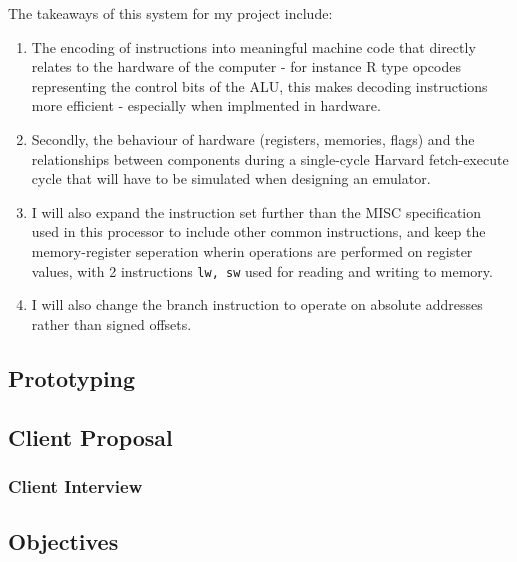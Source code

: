 \bigskip

The takeaways of this system for my project include:
\begin{enumerate}
    \item The encoding of instructions into meaningful machine code that directly relates to the hardware of the computer - for instance R type opcodes representing the control bits of the ALU, this makes decoding instructions more efficient - especially when implmented in hardware.
    \item Secondly, the behaviour of hardware (registers, memories, flags) and the relationships between components during a single-cycle Harvard fetch-execute cycle that will have to be simulated when designing an emulator.
    \item I will also expand the instruction set further than the MISC specification used in this processor to include other common instructions, and keep the memory-register seperation wherin operations are performed on register values, with 2 instructions \texttt{lw, sw} used for reading and writing to memory.
    \item I will also change the branch instruction to operate on absolute addresses rather than signed offsets.
\end{enumerate}

\subsection{Prototyping}
\subsection{Client Proposal}
\subsubsection{Client Interview}
\subsection{Objectives}